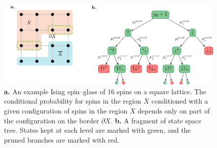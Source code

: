 \begin{figure}
    \centering
    \includegraphics[width=\textwidth]{figures/squarelattice.pdf}
    \caption{\textbf{a.} An example Ising spin--glass  of 16 spins on a square lattice. The conditional probability for spins in the region $\overline{X}$ conditioned with a given configuration of spins in the region $X$ depends only on part of the configuration on the border $\partial X$. \textbf{b.} A fragment of state space tree. States kept at each level are marked with green, and the pruned branches are marked with red.}
    \label{fig:lattice-and-border}
\end{figure}

